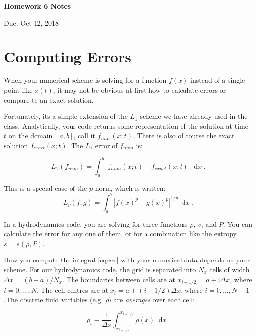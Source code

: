 \documentclass{article}
\newcommand*\diff{\mathop{}\!\mathrm{d}}
\begin{document}
\begin{center}

\vspace*{-2.5cm}
\LARGE
\bf{Homework 6 Notes}
\vspace{1cm}

\large{Due: Oct 12, 2018}
\vspace{1cm}

\end{center}

\section{Computing Errors}

When your numerical scheme is solving for a function $f(x)$ instead of a single point like $x(t)$, it may not be obvious at first how to calculate errors or compare to an exact solution.

Fortunately, its a simple extension of the $L_1$ scheme we have already used in the class.  Analytically, your code returns some representation of the solution at time $t$ on the domain $[a,b]$, call it $f_{num}(x;t)$.  There is also of course the exact solution $f_{exact}(x;t)$.  The $L_1$ error of $f_{num}$ is:

\begin{equation}
	L_1(f_{num}) = \int_a^b \left | f_{num}(x;t) - f_{exact}(x;t) \right | \diff x \ . \label{eq:err}
\end{equation}

This is a special case of the $p$-norm, which is written:
\begin{equation}
	L_p(f,g) = \int_a^b \left | f(x)^p - g(x)^p \right |^{1/p} \diff x \ .
\end{equation}

In a hydrodynamics code, you are solving for three functions $\rho$, $v$, and $P$. You can calculate the error for any one of them, or for a combination like the entropy $s = s(\rho, P)$.  

How you compute the integral \eqref{eq:err} with your numerical data depends on your scheme.  For our hydrodynamics code, the grid is separated into $N_x$ cells of width $\Delta x = (b-a) / N_x$. The boundaries between cells are at $x_{i-1/2} = a+ i \Delta x$, where $i=0,\dots,N$.  The cell centres are at $x_i = a+ (i+1/2) \Delta x$, where $i=0, \dots, N-1$.The discrete fluid variables (e.g. $\rho$) are \emph{averages} over each cell:

\begin{equation}
	\rho_i \equiv \frac{1}{\Delta x}\int_{x_{i-1/2}}^{x_{i+1/2}} \rho(x) \diff x  \ .
\end{equation}
\end{document}
